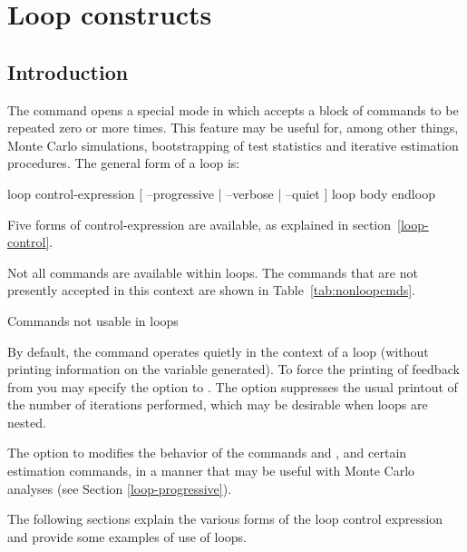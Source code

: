 \chapter{Loop constructs}
\label{chap:looping}

\section{Introduction}
\label{loop-intro}

The command  opens a special mode in which 
accepts a block of commands to be repeated zero or more times.  This
feature may be useful for, among other things, Monte Carlo simulations,
bootstrapping of test statistics and iterative estimation procedures.
The general form of a loop is:

\begin{code}
loop control-expression [ --progressive | --verbose | --quiet ]
   loop body
endloop
\end{code}

Five forms of control-expression are available, as explained in
section~\ref{loop-control}.

Not all  commands are available within loops.  The commands
that are not presently accepted in this context are shown in
Table~\ref{tab:nonloopcmds}.

\begin{table}[htbp]
\caption{Commands not usable in loops}
\label{tab:nonloopcmds}
\begin{center}

\end{center}
\end{table}

By default, the  command operates quietly in the context of
a loop (without printing information on the variable generated).  To
force the printing of feedback from  you may specify the
 option to .  The  option
suppresses the usual printout of the number of iterations performed,
which may be desirable when loops are nested.

The  option to  modifies the behavior of
the commands  and , and certain estimation
commands, in a manner that may be useful with Monte Carlo analyses
(see Section \ref{loop-progressive}).
    
The following sections explain the various forms of the loop control
expression and provide some examples of use of loops.  

